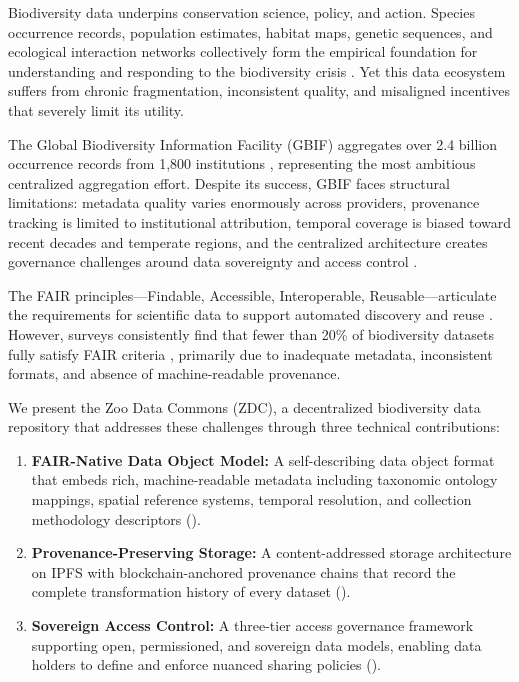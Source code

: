 \documentclass[11pt,a4paper]{article}
\begin{document}
Biodiversity data underpins conservation science, policy, and action.
Species occurrence records, population estimates, habitat maps, genetic sequences, and ecological interaction networks collectively form the empirical foundation for understanding and responding to the biodiversity crisis \citep{diaz2019global}.
Yet this data ecosystem suffers from chronic fragmentation, inconsistent quality, and misaligned incentives that severely limit its utility.

The Global Biodiversity Information Facility (GBIF) aggregates over 2.4 billion occurrence records from 1,800 institutions \citep{gbif2024overview}, representing the most ambitious centralized aggregation effort.
Despite its success, GBIF faces structural limitations: metadata quality varies enormously across providers, provenance tracking is limited to institutional attribution, temporal coverage is biased toward recent decades and temperate regions, and the centralized architecture creates governance challenges around data sovereignty and access control \citep{yesson2007how}.

The FAIR principles---Findable, Accessible, Interoperable, Reusable---articulate the requirements for scientific data to support automated discovery and reuse \citep{wilkinson2016fair}.
However, surveys consistently find that fewer than 20\% of biodiversity datasets fully satisfy FAIR criteria \citep{jacobsen2020fair}, primarily due to inadequate metadata, inconsistent formats, and absence of machine-readable provenance.

We present the Zoo Data Commons (ZDC), a decentralized biodiversity data repository that addresses these challenges through three technical contributions:

\begin{enumerate}[leftmargin=*]
    \item \textbf{FAIR-Native Data Object Model:} A self-describing data object format that embeds rich, machine-readable metadata including taxonomic ontology mappings, spatial reference systems, temporal resolution, and collection methodology descriptors ().
    \item \textbf{Provenance-Preserving Storage:} A content-addressed storage architecture on IPFS with blockchain-anchored provenance chains that record the complete transformation history of every dataset ().
    \item \textbf{Sovereign Access Control:} A three-tier access governance framework supporting open, permissioned, and sovereign data models, enabling data holders to define and enforce nuanced sharing policies ().
\end{enumerate}
\end{document}
